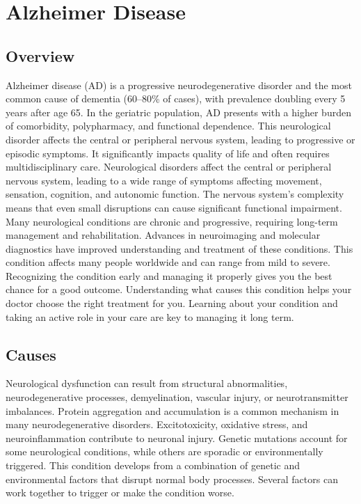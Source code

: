 \chapter{Alzheimer Disease}
\label{sec:Alzheimer Disease}

\section{Overview}


Alzheimer disease (AD) is a progressive neurodegenerative disorder and the most common cause of dementia (60--80\% of cases), with prevalence doubling every 5 years after age 65. In the geriatric population, AD presents with a higher burden of comorbidity, polypharmacy, and functional dependence. This neurological disorder affects the central or peripheral nervous system, leading to progressive or episodic symptoms. It significantly impacts quality of life and often requires multidisciplinary care. Neurological disorders affect the central or peripheral nervous system, leading to a wide range of symptoms affecting movement, sensation, cognition, and autonomic function. The nervous system's complexity means that even small disruptions can cause significant functional impairment. Many neurological conditions are chronic and progressive, requiring long-term management and rehabilitation. Advances in neuroimaging and molecular diagnostics have improved understanding and treatment of these conditions. This condition affects many people worldwide and can range from mild to severe. Recognizing the condition early and managing it properly gives you the best chance for a good outcome. Understanding what causes this condition helps your doctor choose the right treatment for you. Learning about your condition and taking an active role in your care are key to managing it long term.

\section{Causes}
Neurological dysfunction can result from structural abnormalities, neurodegenerative processes, demyelination, vascular injury, or neurotransmitter imbalances. Protein aggregation and accumulation is a common mechanism in many neurodegenerative disorders. Excitotoxicity, oxidative stress, and neuroinflammation contribute to neuronal injury. Genetic mutations account for some neurological conditions, while others are sporadic or environmentally triggered. This condition develops from a combination of genetic and environmental factors that disrupt normal body processes. Several factors can work together to trigger or make the condition worse.

